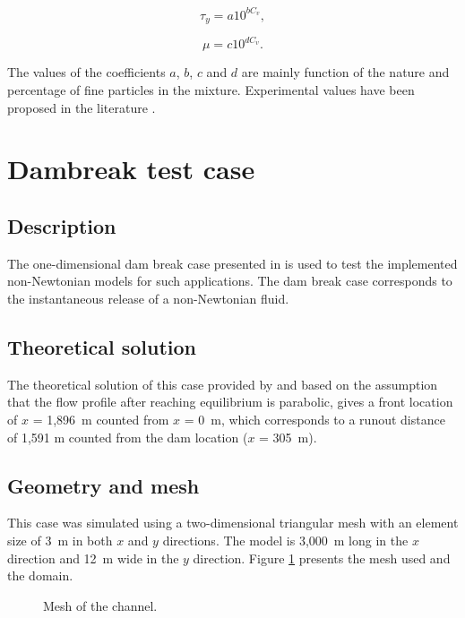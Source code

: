 \begin{equation}
  \tau_y=a10^{bC_v},
  \label{mix1}
\end{equation}

\begin{equation}
  \mu=c10^{dC_v}.
  \label{mix2}
\end{equation}

The values of the coefficients $a$, $b$, $c$ and $d$ are mainly function of the
nature and percentage of fine particles in the mixture.
Experimental values have been proposed in the literature \cite{julien2010erosion}.

\section{Dambreak test case}

\subsection{Description}

The one-dimensional dam break case presented in \cite{hungr1995model} is used to
test the implemented non-Newtonian models for such applications.
The dam break case corresponds to the instantaneous release of a non-Newtonian
fluid.

\subsection{Theoretical solution}

The theoretical solution of this case provided by \cite{naef2006comparison} and
based on the assumption that the flow profile after reaching equilibrium is
parabolic, gives a front location of $x$ = 1,896~m counted from $x$ = 0~m,
which corresponds to a runout distance of 1,591 m counted from the dam location
($x$ = 305~m).

\subsection{Geometry and mesh}

This case was simulated using a two-dimensional triangular mesh with an element
size of 3~m in both $x$ and $y$ directions.
The model is 3,000~m long in the $x$ direction and 12~m wide in the $y$ direction.
Figure \ref{nnnewt:mesh} presents the mesh used and the domain.

\begin{figure}[!htbp]
 \centering
 \caption{Mesh of the channel.}
 \label{nnnewt:mesh}
\end{figure}

